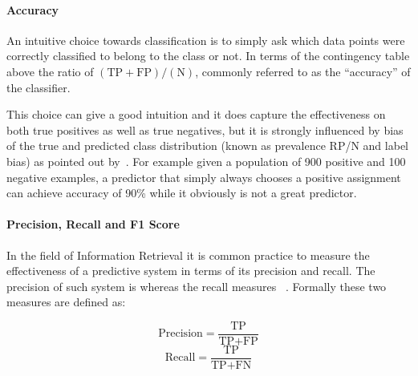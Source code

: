 \paragraph{Accuracy}
\label{par:Accuracy}

An intuitive choice towards classification is to simply ask which data points were correctly classified to belong to the class or not. In terms of the contingency table above the ratio of $(\text{TP} + \text{FP}) / (\text{N})$, commonly referred to as the ``accuracy'' of the classifier.

This choice can give a good intuition and it does capture the effectiveness on both true positives as well as true negatives, but it is strongly influenced by bias of the true and predicted class distribution (known as prevalence RP/N and label bias) as pointed out by~\cite{Powers:2011aa}. For example given a population of 900 positive and 100 negative examples, a predictor that simply always chooses a positive assignment can achieve accuracy of 90\% while it obviously is not a great predictor.

\cite[Chapter 8.3, p.~155]{Manning:2008aa}

\paragraph{Precision, Recall and F1 Score}
\label{par:Precision, Recall and F1 Score}

In the field of Information Retrieval it is common practice to measure the effectiveness of a predictive system in terms of its precision and recall.
The precision of such system is  whereas the recall measures ~\cite{Rijsbergen:1979aa}. Formally these two measures are defined as:

\begin{equation}
    \text{Precision} = \frac{\text{TP}}{\text{TP} + \text{FP}}
\end{equation}
\begin{equation}
    \text{Recall} = \frac{\text{TP}}{\text{TP} + \text{FN}}
\end{equation}


